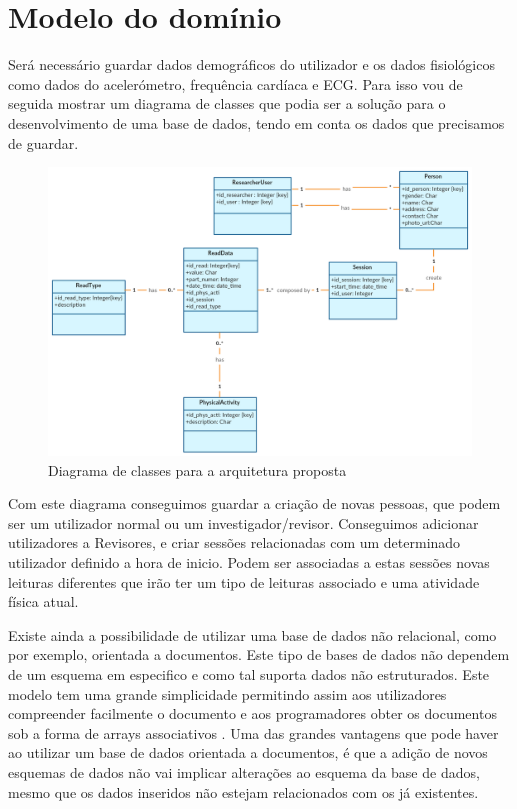 \section{Modelo do domínio}

Será necessário guardar dados demográficos do utilizador e os dados fisiológicos como dados do acelerómetro, frequência cardíaca e \gls{ECG}. Para isso vou de seguida mostrar um diagrama de classes que podia ser a solução para o desenvolvimento de uma base de dados, tendo em conta os dados que precisamos de guardar.

\begin{figure}[H]
  \centering
  \includegraphics[width=1\textwidth]{imgs/class-diagram.png}
  \caption[Diagrama de classes para a arquitetura proposta]{Diagrama de classes para a arquitetura proposta}
  
  \label{f:class-diagram}
\end{figure}

Com este diagrama conseguimos guardar a criação de novas pessoas, que podem ser um utilizador normal ou um investigador/revisor. Conseguimos adicionar utilizadores a Revisores, e criar sessões relacionadas com um determinado utilizador definido a hora de inicio. Podem ser associadas a estas sessões novas leituras diferentes que irão ter um tipo de leituras associado e uma atividade física atual.
\par 
Existe ainda a possibilidade de utilizar uma base de dados não relacional, como por exemplo, orientada a documentos. Este tipo de bases de dados não dependem de um esquema em especifico e como tal suporta dados não estruturados. Este modelo tem uma grande simplicidade permitindo assim aos utilizadores compreender facilmente o documento e aos programadores  obter os documentos sob a forma de arrays associativos \cite{nosql}. Uma das grandes vantagens que pode haver ao utilizar um base de dados orientada a documentos, é que a adição de novos esquemas de dados não vai implicar alterações ao esquema da base de dados, mesmo que os dados inseridos não estejam relacionados com os já existentes.

